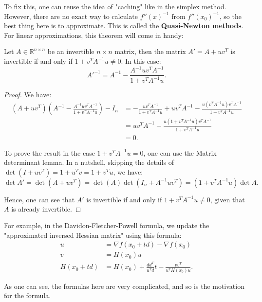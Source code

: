 To fix this, one can reuse the idea of "caching" like in the simplex method.
However, there are no exact way to calculate \( f''(x)^{-1} \) from \(
f''(x_{0})^{-1} \), so the best thing here is to approximate. This is called the
\textbf{Quasi-Newton methods}. For linear approximations,
this theorem will come in handy:

\begin{theorem}
\label{thr:Sherman-Morrison formula}
  Let \( A \in \mathbb{R}^{n\times n} \) be an invertible \( n\times n \)
  matrix, then the matrix \( A' = A + uv^{T} \) is invertible if and only if \(
  1 + v^{T}A^{-1}u \neq 0\). In this case:
  \[
    A'^{-1} = A^{-1} - \frac{A^{-1}uv^{T}A^{-1}}{1 + v^{T}A^{-1}u}
  .\] 
\end{theorem}

\begin{proof}
  We have:
  \begin{align*}
    (A + uv^{T})(A^{-1}-\frac{A^{-1}uv^{T}A^{-1}}{1 + v^{T}A^{-1}u}) - I_{n} &= -
    \frac{uv^{T}A^{-1}}{1 + v^{T}A^{-1}u} + uv^{T}A^{-1}
    -\frac{u(v^{T}A^{-1}u)v^{T}A^{-1}}{1 + v^{T}A^{-1}u}\\
    &= uv^{T}A^{-1} -  \frac{u(1 + v^{T}A^{-1}u)v^{T}A^{-1}}{1 + v^{T}A^{-1}u} \\
    &= 0
  .\end{align*}

  To prove the result in the case \( 1 + v^{T}A^{-1}u = 0 \), one can use the
  Matrix determinant lemma. In a nutshell, skipping the details of \( \det(I +
  uv^{T}) = 1 +  u^{T}v = 1 + v^{T}u \), we have:
  \[
    \det A' = \det(A + uv^{T}) = \det(A) \det(I_{n} + A^{-1}uv^{T}) = (1 +
    v^{T}A^{-1}u)\det A
  .\] 

  Hence, one can see that \( A' \) is invertible if and only if \( 1 +
  v^{T}A^{-1}u \neq 0 \), given that \( A \) is already invertible.
\end{proof}

For example, in the Davidon-Fletcher-Powell formula, we update the "approximated
inversed Hessian matrix" using this formula:
\begin{align*}
  u &=  \nabla f(x_{0} + t d) - \nabla f(x_{0}) \\
  v &= H(x_{0})u \\
  H(x_{0} + t d) &= H(x_{0}) + \frac{dd^{T}}{u^{T}d}t - \frac{vv^{T}}{u^{T}H(x_{0})u}
.\end{align*}

As one can see, the formulas here are very complicated, and so is the motivation for
the formula.

